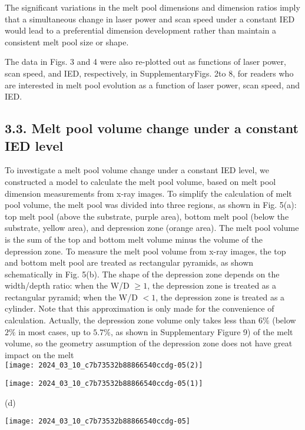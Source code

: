 \documentclass[10pt]{article}
\begin{document}
The significant variations in the melt pool dimensions and dimension ratios imply that a simultaneous change in laser power and scan speed under a constant IED would lead to a preferential dimension development rather than maintain a consistent melt pool size or shape.

The data in Figs. 3 and 4 were also re-plotted out as functions of laser power, scan speed, and IED, respectively, in SupplementaryFigs. 2to 8, for readers who are interested in melt pool evolution as a function of laser power, scan speed, and IED.

\subsection*{3.3. Melt pool volume change under a constant IED level}
To investigate a melt pool volume change under a constant IED level, we constructed a model to calculate the melt pool volume, based on melt pool dimension measurements from x-ray images. To simplify the calculation of melt pool volume, the melt pool was divided into three regions, as shown in Fig. 5(a): top melt pool (above the substrate, purple area), bottom melt pool (below the substrate, yellow area), and depression zone (orange area). The melt pool volume is the sum of the top and bottom melt volume minus the volume of the depression zone. To measure the melt pool volume from x-ray images, the top and bottom melt pool are treated as rectangular pyramids, as shown schematically in Fig. 5(b). The shape of the depression zone depends on the width/depth ratio: when the W/D $\geq 1$, the depression zone is treated as a rectangular pyramid; when the W/D $<1$, the depression zone is treated as a cylinder. Note that this approximation is only made for the convenience of calculation. Actually, the depression zone volume only takes less than $6 \%$ (below $2 \%$ in most cases, up to $5.7 \%$, as shown in Supplementary Figure 9) of the melt volume, so the geometry assumption of the depression zone does not have great impact on the melt\\
\texttt{[image: 2024\_03\_10\_c7b73532b88866540ccdg-05(2)]}

\begin{center}
\texttt{[image: 2024\_03\_10\_c7b73532b88866540ccdg-05(1)]}
\end{center}

(d)

\begin{center}
\texttt{[image: 2024\_03\_10\_c7b73532b88866540ccdg-05]}
\end{center}
\end{document}

